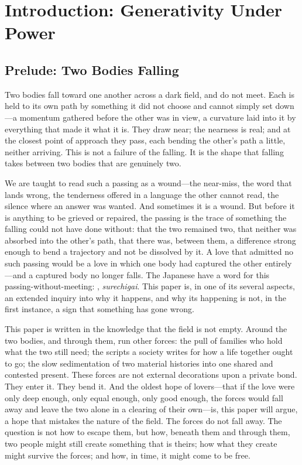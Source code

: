\section{Introduction: Generativity Under Power}
\label{p17:sec:intro}

\subsection*{Prelude: Two Bodies Falling}

\noindent
Two bodies fall toward one another across a dark field, and do not meet. Each is held to its own path by something it did not choose and cannot simply set down---a momentum gathered before the other was in view, a curvature laid into it by everything that made it what it is. They draw near; the nearness is real; and at the closest point of approach they pass, each bending the other's path a little, neither arriving. This is not a failure of the falling. It is the shape that falling takes between two bodies that are genuinely two.

We are taught to read such a passing as a wound---the near-miss, the word that lands wrong, the tenderness offered in a language the other cannot read, the silence where an answer was wanted. And sometimes it is a wound. But before it is anything to be grieved or repaired, the passing is the trace of something the falling could not have done without: that the two remained two, that neither was absorbed into the other's path, that there was, between them, a difference strong enough to bend a trajectory and not be dissolved by it. A love that admitted no such passing would be a love in which one body had captured the other entirely---and a captured body no longer falls. The Japanese have a word for this passing-without-meeting: , \emph{surechigai}. This paper is, in one of its several aspects, an extended inquiry into why it happens, and why its happening is not, in the first instance, a sign that something has gone wrong.

This paper is written in the knowledge that the field is not empty. Around the two bodies, and through them, run other forces: the pull of families who hold what the two still need; the scripts a society writes for how a life together ought to go; the slow sedimentation of two material histories into one shared and contested present. These forces are not external decorations upon a private bond. They enter it. They bend it. And the oldest hope of lovers---that if the love were only deep enough, only equal enough, only good enough, the forces would fall away and leave the two alone in a clearing of their own---is, this paper will argue, a hope that mistakes the nature of the field. The forces do not fall away. The question is not how to escape them, but how, beneath them and through them, two people might still create something that is theirs; how what they create might survive the forces; and how, in time, it might come to be free.

